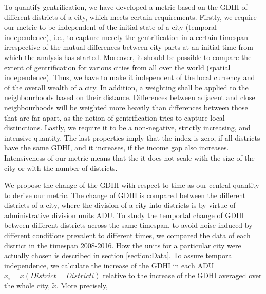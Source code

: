 \documentclass[a4paper, 10pt, conference]{ieeeconf}      %
\begin{document}



To quantify gentrification, we have developed a metric based on the GDHI of different districts of a city, which meets certain requirements.
Firstly, we require our metric to be independent of the initial state of a city (temporal independence),  i.e., to capture merely the
gentrification in a certain timespan irrespective of the mutual differences between city parts at an initial time from which the analysis
has started. Moreover, it should be possible to compare the extent of gentrification for various cities from all over the world (spatial independence).
Thus, we have to make it independent of the local currency and of the overall wealth of a city. In addition, a weighting shall be applied to the
neighbourhoods based on their distance. Differences between adjacent and close neighbourhoods will be weighted more heavily than differences between
those that are far apart, as the notion of gentrification tries to capture local distinctions. Lastly, we require it to be a 
non-negative, strictly increasing, and intensive quantity. The last properties imply that the index is zero, if all districts have the same GDHI, 
and it increases, if the income gap also increases. Intensiveness of our metric means that the it does not scale with the size of the city or with
the number of districts.

We propose the change of the GDHI with respect to time as our central quantity to derive our metric. The change of GDHI is compared between the different
districts of a city, where the division of a city into districts is  by virtue of administrative division units ADU. To study the temportal change of GDHI
between different districts across the same timespan, to avoid noise induced by different conditions prevalent to different times, we compared the data of
each district in the timespan 2008-2016. How the units for a particular city were actually chosen is described in section \ref{section:Data}.
To assure temporal independence, we calculate the increase of the GDHI in each ADU $x_{i}=x(District = District i)$ relative to the increase of the GDHI 
averaged over the whole city, $\tilde{x}$. More precisely, 
\end{document}
